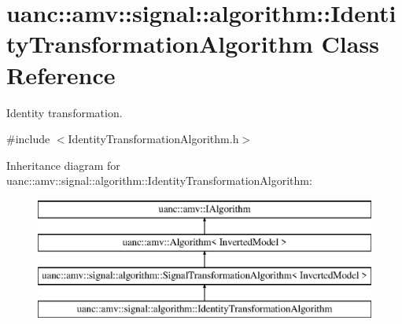 \hypertarget{classuanc_1_1amv_1_1signal_1_1algorithm_1_1_identity_transformation_algorithm}{}\section{uanc\+:\+:amv\+:\+:signal\+:\+:algorithm\+:\+:Identity\+Transformation\+Algorithm Class Reference}
\label{classuanc_1_1amv_1_1signal_1_1algorithm_1_1_identity_transformation_algorithm}


Identity transformation.  




{\ttfamily \#include $<$Identity\+Transformation\+Algorithm.\+h$>$}

Inheritance diagram for uanc\+:\+:amv\+:\+:signal\+:\+:algorithm\+:\+:Identity\+Transformation\+Algorithm\+:\begin{figure}[H]
\begin{center}
\leavevmode
\includegraphics[height=4.000000cm]{classuanc_1_1amv_1_1signal_1_1algorithm_1_1_identity_transformation_algorithm}
\end{center}
\end{figure}

